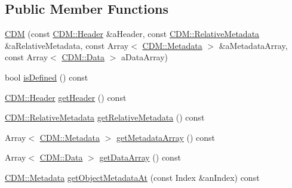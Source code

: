 \subsection*{Public Member Functions}
\begin{DoxyCompactItemize}
\item 
\hyperlink{classostk_1_1astro_1_1conjunction_1_1messages_1_1ccsds_1_1_c_d_m_a7384b77a16261388ac290456f9691da2}{C\+DM} (const \hyperlink{structostk_1_1astro_1_1conjunction_1_1messages_1_1ccsds_1_1_c_d_m_1_1_header}{C\+D\+M\+::\+Header} \&a\+Header, const \hyperlink{structostk_1_1astro_1_1conjunction_1_1messages_1_1ccsds_1_1_c_d_m_1_1_relative_metadata}{C\+D\+M\+::\+Relative\+Metadata} \&a\+Relative\+Metadata, const Array$<$ \hyperlink{structostk_1_1astro_1_1conjunction_1_1messages_1_1ccsds_1_1_c_d_m_1_1_metadata}{C\+D\+M\+::\+Metadata} $>$ \&a\+Metadata\+Array, const Array$<$ \hyperlink{structostk_1_1astro_1_1conjunction_1_1messages_1_1ccsds_1_1_c_d_m_1_1_data}{C\+D\+M\+::\+Data} $>$ a\+Data\+Array)
\item 
bool \hyperlink{classostk_1_1astro_1_1conjunction_1_1messages_1_1ccsds_1_1_c_d_m_a39f28f415e78bef70b530192bb30cd29}{is\+Defined} () const
\item 
\hyperlink{structostk_1_1astro_1_1conjunction_1_1messages_1_1ccsds_1_1_c_d_m_1_1_header}{C\+D\+M\+::\+Header} \hyperlink{classostk_1_1astro_1_1conjunction_1_1messages_1_1ccsds_1_1_c_d_m_ac00f056f87d9b31a531da727d3d3f09b}{get\+Header} () const
\item 
\hyperlink{structostk_1_1astro_1_1conjunction_1_1messages_1_1ccsds_1_1_c_d_m_1_1_relative_metadata}{C\+D\+M\+::\+Relative\+Metadata} \hyperlink{classostk_1_1astro_1_1conjunction_1_1messages_1_1ccsds_1_1_c_d_m_a9985ac10e77d5397948029614fdba672}{get\+Relative\+Metadata} () const
\item 
Array$<$ \hyperlink{structostk_1_1astro_1_1conjunction_1_1messages_1_1ccsds_1_1_c_d_m_1_1_metadata}{C\+D\+M\+::\+Metadata} $>$ \hyperlink{classostk_1_1astro_1_1conjunction_1_1messages_1_1ccsds_1_1_c_d_m_a2a2e07c7f8993b028aba46ac4d6d7f9c}{get\+Metadata\+Array} () const
\item 
Array$<$ \hyperlink{structostk_1_1astro_1_1conjunction_1_1messages_1_1ccsds_1_1_c_d_m_1_1_data}{C\+D\+M\+::\+Data} $>$ \hyperlink{classostk_1_1astro_1_1conjunction_1_1messages_1_1ccsds_1_1_c_d_m_aa9349ce65e7a723c1acd54259b4a432e}{get\+Data\+Array} () const
\item 
\hyperlink{structostk_1_1astro_1_1conjunction_1_1messages_1_1ccsds_1_1_c_d_m_1_1_metadata}{C\+D\+M\+::\+Metadata} \hyperlink{classostk_1_1astro_1_1conjunction_1_1messages_1_1ccsds_1_1_c_d_m_a56417d8fc01b6d21b8daa60315306e8a}{get\+Object\+Metadata\+At} (const Index \&an\+Index) const

\end{DoxyCompactItemize}

